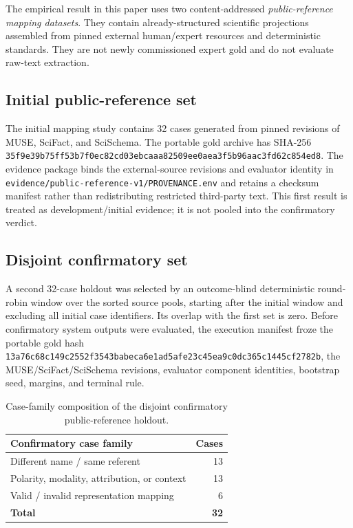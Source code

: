The empirical result in this paper uses two content-addressed
\emph{public-reference mapping datasets}. They contain already-structured
scientific projections assembled from pinned external human/expert resources
and deterministic standards. They are not newly commissioned expert gold and
do not evaluate raw-text extraction.

\subsection{Initial public-reference set}

The initial mapping study contains 32 cases generated from pinned revisions of
MUSE, SciFact, and SciSchema. The portable gold archive has SHA-256
\texttt{35f9e39b75ff53b7f0ec82cd03ebcaaa82509ee0aea3f5b96aac3fd62c854ed8}.
The evidence package binds the external-source revisions and evaluator
identity in \texttt{evidence/public-reference-v1/PROVENANCE.env} and retains a
checksum manifest rather than redistributing restricted third-party text.
This first result is treated as development/initial evidence; it is not pooled
into the confirmatory verdict.

\subsection{Disjoint confirmatory set}

A second 32-case holdout was selected by an outcome-blind deterministic
round-robin window over the sorted source pools, starting after the initial
window and excluding all initial case identifiers. Its overlap with the first
set is zero. Before confirmatory system outputs were evaluated, the execution
manifest froze the portable gold hash
\texttt{13a76c68c149c2552f3543babeca6e1ad5afe23c45ea9c0dc365c1445cf2782b},
the MUSE/SciFact/SciSchema revisions, evaluator component identities,
bootstrap seed, margins, and terminal rule.

\begin{table}[t]
\centering
\small
\begin{tabular}{lr}
\toprule
\textbf{Confirmatory case family} & \textbf{Cases} \\
\midrule
Different name / same referent & 13 \\
Polarity, modality, attribution, or context & 13 \\
Valid / invalid representation mapping & 6 \\
\midrule
\textbf{Total} & \textbf{32} \\
\bottomrule
\end{tabular}
\caption{Case-family composition of the disjoint confirmatory
public-reference holdout.}
\label{tab:public-reference-families}
\end{table}

